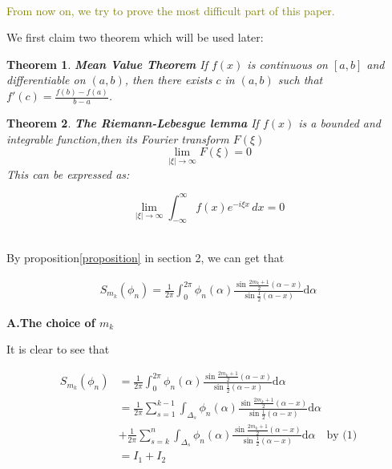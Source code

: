 \documentclass{article}
\newtheorem{theorem}{Theorem}
\begin{document}
~\\
\textcolor{olive}{From now on, we try to prove the most difficult part of this paper.}

We first claim two theorem which will be used later:

\begin{theorem}
    \textbf{Mean Value Theorem} If $f(x)$ is continuous on $[a, b]$ and differentiable on $(a, b)$, then there exists $c$ in $(a, b)$ such that $f'(c) = \frac{f(b) - f(a)}{b - a}$.

\end{theorem}
\begin{theorem}
    \textbf{The Riemann-Lebesgue lemma} If $f(x)$ is a bounded and integrable function,then its Fourier transform $F(\xi)$ 
    \[
    \lim_{|\xi| \to \infty} F(\xi) = 0
    \]
    This can be expressed as:

\[
\lim_{|\xi| \to \infty} \int_{-\infty}^{\infty} f(x) e^{-i\xi x} \, dx = 0
\]

    
\end{theorem}














~\\

By proposition\ref{proposition} in section 2, we can get that 


\begin{align}
    S_{m_k}(\phi_n)=\frac{1}{2\pi}\int_{0}^{2\pi}\phi_n(\alpha)\frac{\sin\frac{2m_k+1}{2}(\alpha-x)}{\sin\frac{1}{2}(\alpha-x)}\mathrm{d}\alpha
\end{align}

\textbf{A.The choice of $ m_k $}

It is clear to see that 


\begin{align*}
    S_{m_k}(\phi_n)&=\frac{1}{2\pi}\int_{0}^{2\pi}\phi_n(\alpha)\frac{\sin\frac{2m_k+1}{2}(\alpha-x)}{\sin\frac{1}{2}(\alpha-x)}\mathrm{d}\alpha\\
    &=\frac{1}{2\pi}\sum_{s=1}^{k-1}\int_{\Delta_s}\phi_n(\alpha)\frac{\sin\frac{2m_k+1}{2}(\alpha-x)}{\sin\frac{1}{2}(\alpha-x)}\mathrm{d}\alpha \\
    &+ \frac{1}{2\pi}\sum_{s=k}^{n}\int_{\Delta_s}\phi_n(\alpha)\frac{\sin\frac{2m_k+1}{2}(\alpha-x)}{\sin\frac{1}{2}(\alpha-x)}\mathrm{d}\alpha \quad \text{by (1)}\\
    &=I_1+I_2 
\end{align*}
\end{document}
